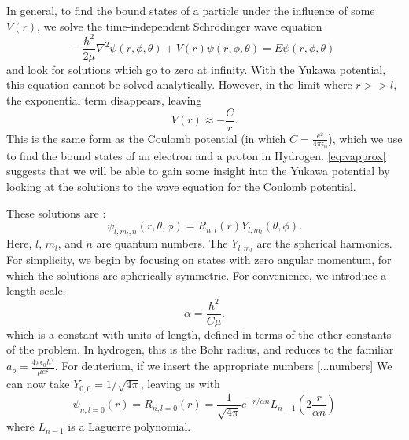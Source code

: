 \documentclass[12pt,twoside]{reedthesis}
\newcommand{\eqn}[1]{\begin{equation}#1\end{equation}}
\begin{document}
In general, to find the bound states of a particle under the influence of some $V(r)$, we solve the time-independent Schr\"odinger wave equation
\eqn{
-\frac{\hbar^2}{2\mu}\nabla^2\psi(r,\phi,\theta) + V(r)\psi (r,\phi,\theta) = E \psi(r,\phi,\theta)
\label{eq:TIDSWE-general}
} and look for solutions which go to zero at infinity.
With the Yukawa potential, this equation cannot be solved analytically. However, in the limit where $r >> l$, the exponential term disappears, leaving
\eqn{
V(r) \approx -\frac{C}{r}\mbox{.}
\label{eq:vapprox}
}
This is the same form as the Coulomb potential (in which $C = \frac{e^2}{4\pi\epsilon_0}$), which we use to find the bound states of an electron and a proton in Hydrogen. \eqref{eq:vapprox} suggests that we will be able to gain some insight into the Yukawa potential by looking at the solutions to the wave equation for the Coulomb potential. 

These solutions are \cite{griffiths_introduction_2005}:
\eqn{
\psi_{l, m_l, n} (r, \theta, \phi) = R_{n,l}(r) Y_{l,m_l}(\theta,\phi)\mbox{.}
}
Here, $l$, $m_l$, and $n$ are quantum numbers. The $Y_{l, m_l}$ are the spherical harmonics. For simplicity, we begin by focusing on states with zero angular momentum, for which the solutions are spherically symmetric.
For convenience, we introduce a length scale, 
\eqn{
\alpha = \frac{\hbar^2}{C \mu}\mbox{.}
\label{eq:bohrradius}
}
which is a constant with units of length, defined in terms of the other constants of the problem. 
In hydrogen, this is the Bohr radius, and reduces to the familiar $a_o = \frac{4\pi \epsilon_0 \hbar^2}{\mu e^2}$. For deuterium, if we insert the appropriate numbers [...numbers] 
We can now take $Y_{0,0} = 1/\sqrt{4 \pi}$, leaving us with
\eqn{
\psi_{n, l =0}(r) = R_{n , l= 0}(r) = \frac{1}{\sqrt{4\pi}} e^{-r /\alpha n}L_{n-1} \left(2\frac{r}{ \alpha n}\right)
\label{eq:SWE-coulomb}
}
where $L_{n-1}$ is a Laguerre polynomial. 
\end{document}
